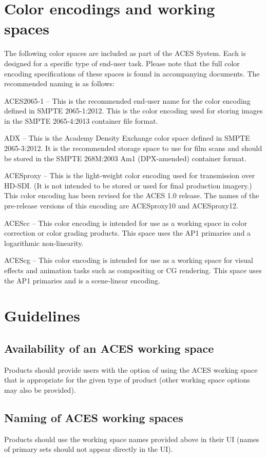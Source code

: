 \section{Color encodings and working spaces}
The following color spaces are included as part of the ACES System. Each is designed for a specific type of end-user task. Please note that the full color encoding specifications of these spaces is found in accompanying documents. The recommended naming is as follows:

ACES2065-1 -- This is the recommended end-user name for the color encoding defined in SMPTE 2065-1:2012. This is the color encoding used for storing images in the SMPTE 2065-4:2013 container file format.

ADX -- This is the Academy Density Exchange color space defined in SMPTE 2065-3:2012. It is the recommended storage space to use for film scans and should be stored in the SMPTE 268M:2003 Am1 (DPX-amended) container format.

ACESproxy -- This is the light-weight color encoding used for transmission over HD-SDI. (It is not intended to be stored or used for final production imagery.) This color encoding has been revised for the ACES 1.0 release. The names of the pre-release versions of this encoding are ACESproxy10 and ACESproxy12.

ACEScc -- This color encoding is intended for use as a working space in color correction or color grading products. This space uses the AP1 primaries and a logarithmic non-linearity. 

ACEScg -- This color encoding is intended for use as a working space for visual effects and animation tasks such as compositing or CG rendering. This space uses the AP1 primaries and is a scene-linear encoding.

\section{Guidelines}
\subsection{Availability of an ACES working space}
Products should provide users with the option of using the ACES working space that is appropriate for the given type of product (other working space options may also be provided).

\subsection{Naming of ACES working spaces}
Products should use the working space names provided above in their UI (names of primary sets should not appear directly in the UI).